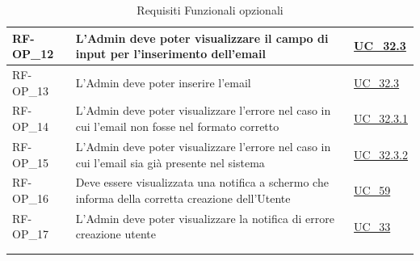 \begin{longtable}{|>{\raggedright}p{}|>{\raggedright\arraybackslash}p{}|>{\raggedright\arraybackslash}p{}|}
	\hline
	RF-OP\_12 \hypertarget{rf-op_12} & L'Admin deve poter visualizzare il campo di input per l'inserimento dell'email & \hyperref[uc_32.3]{UC\_32.3} \\
	\hline
	RF-OP\_13 \hypertarget{rf-op_13} & L'Admin deve poter inserire l'email & \hyperref[uc_32.3]{UC\_32.3} \\
	\hline
	RF-OP\_14 \hypertarget{rf-op_14} & L'Admin deve poter visualizzare l'errore nel caso in cui l'email non fosse nel formato corretto & \hyperref[uc_32.3.1]{UC\_32.3.1} \\
	\hline
	RF-OP\_15 \hypertarget{rf-op_15} & L'Admin deve poter visualizzare l'errore nel caso in cui l'email sia già presente nel sistema & \hyperref[uc_32.3.2]{UC\_32.3.2} \\
	\hline
	RF-OP\_16 \hypertarget{rf-op_16} & Deve essere visualizzata una notifica a schermo che informa della corretta creazione dell'Utente & \hyperref[uc_59]{UC\_59} \\
	\hline
	RF-OP\_17 \hypertarget{rf-op_17} & L'Admin deve poter visualizzare la notifica di errore creazione utente & \hyperref[uc_33]{UC\_33}\\
	\hline
	\multicolumn{3}{c}{} \\
	\caption{Requisiti Funzionali opzionali}\hypertarget{tab:funzionali_opzionali}\\

\end{longtable}
